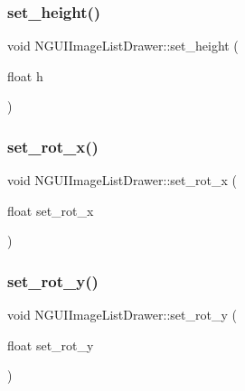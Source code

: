 \hypertarget{class_n_g_u_i_image_list_drawer_ae617fcff663baf719ea4b543f810ce22}{}\label{class_n_g_u_i_image_list_drawer_ae617fcff663baf719ea4b543f810ce22} 
\subsubsection{\texorpdfstring{set\+\_\+height()}{set\_height()}}
{\footnotesize\ttfamily void N\+G\+U\+I\+Image\+List\+Drawer\+::set\+\_\+height (\begin{DoxyParamCaption}\item[{float}]{h }\end{DoxyParamCaption})}

\hypertarget{class_n_g_u_i_image_list_drawer_a8a50f93ab73366218d5213b0847d81f0}{}\label{class_n_g_u_i_image_list_drawer_a8a50f93ab73366218d5213b0847d81f0} 
\subsubsection{\texorpdfstring{set\+\_\+rot\+\_\+x()}{set\_rot\_x()}}
{\footnotesize\ttfamily void N\+G\+U\+I\+Image\+List\+Drawer\+::set\+\_\+rot\+\_\+x (\begin{DoxyParamCaption}\item[{float}]{set\+\_\+rot\+\_\+x }\end{DoxyParamCaption})}

\hypertarget{class_n_g_u_i_image_list_drawer_ac367200e8dc857ff59e6e724c667e805}{}\label{class_n_g_u_i_image_list_drawer_ac367200e8dc857ff59e6e724c667e805} 
\subsubsection{\texorpdfstring{set\+\_\+rot\+\_\+y()}{set\_rot\_y()}}
{\footnotesize\ttfamily void N\+G\+U\+I\+Image\+List\+Drawer\+::set\+\_\+rot\+\_\+y (\begin{DoxyParamCaption}\item[{float}]{set\+\_\+rot\+\_\+y }\end{DoxyParamCaption})}

